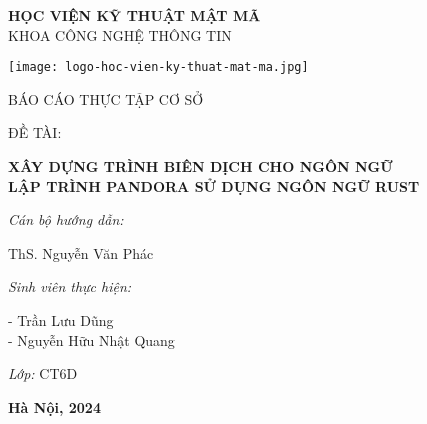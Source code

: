 
\fontsize{16}{19.2pt}\selectfont 
\vspace{-1cm}
\begin{center}
    \textbf{ HỌC VIỆN KỸ THUẬT MẬT MÃ}\\
    KHOA CÔNG NGHỆ THÔNG TIN
\end{center}



\vspace{-0.5cm}

\begin{center}
    \texttt{[image: logo-hoc-vien-ky-thuat-mat-ma.jpg]}
\end{center}

\vspace{-1cm}
\begin{center}
    BÁO CÁO THỰC TẬP CƠ SỞ \\
\end{center}

\vspace{-0.5cm}
ĐỀ TÀI:
\fontsize{18}{21.6pt}\selectfont 
\begin{center}
    \textbf{XÂY DỰNG TRÌNH BIÊN DỊCH CHO NGÔN NGỮ\\LẬP TRÌNH PANDORA SỬ DỤNG NGÔN NGỮ RUST\\}
\end{center}

\vspace{1cm}
{\bf{
    \hspace{\parindent}\textit{Cán bộ hướng dẫn:}

     ThS. Nguyễn Văn Phác

    \hspace{\parindent}\textit{Sinh viên thực hiện:}

     - Trần Lưu Dũng\\
     - Nguyễn Hữu Nhật Quang
    
    \hspace{\parindent}\textit{Lớp: } CT6D
    
}}

\vfill 
\begin{center}
   \bf{Hà Nội, 2024}
\end{center}
